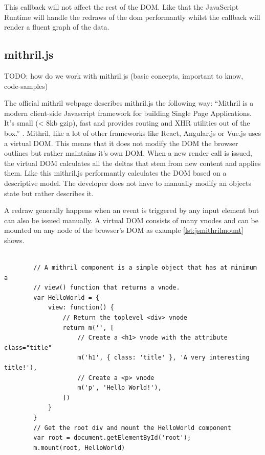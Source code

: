 This callback will not affect the rest of the DOM. Like that the JavaScript Runtime will handle the redraws of the dom performantly whilst the callback will render a fluent graph of the data.

\subsection{mithril.js}

TODO: how do we work with mithril.js (basic concepts, important to know, code-samples)

The official mithril webpage describes mithril.js the following way: ``Mithril is a modern client-side Javascript framework for building Single Page Applications. It's small (< 8kb gzip), fast and provides routing and XHR utilities out of the box.'' \cite{TODO: mithril.js.org}. Mithril, like a lot of other frameworks like React, Angular.js or Vue.js uses a virtual DOM. This means that it does not modify the DOM the browser outlines but rather maintains it's own DOM. When a new render call is issued, the virtual DOM calculates all the deltas that stem from new content and applies them. Like this mithril.js performantly calculates the DOM based on a descriptive model. The developer does not have to manually modify an objects state but rather describes it.

A redraw generally happens when an event is triggered by any input element but can also be issued manually.
A virtual DOM consists of many vnodes and can be mounted on any node of the browser's DOM as example \ref{lst:jsmithrilmount} shows.

\begin{tcolorbox}[
        title={
            \refstepcounter{listing}
            Listing \thelisting: JavaScript ``Get 2D Rendering Context''
            \label{lst:js2dcontext}
            \addcontentsline{lol}{listing}{\protect\numberline{\thelisting}}
        }
    ]
    \begin{verbatim}

        // A mithril component is a simple object that has at minimum a
        // view() function that returns a vnode.
        var HelloWorld = {
            view: function() {
                // Return the toplevel <div> vnode
                return m('', [
                    // Create a <h1> vnode with the attribute class="title"
                    m('h1', { class: 'title' }, 'A very interesting title!'),
                    // Create a <p> vnode
                    m('p', 'Hello World!'),
                ])
            }
        }
        // Get the root div and mount the HelloWorld component
        var root = document.getElementById('root');
        m.mount(root, HelloWorld)
    \end{verbatim}
\end{tcolorbox}

